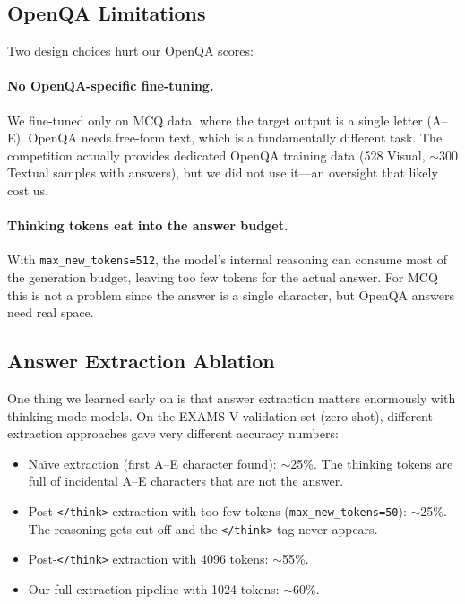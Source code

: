 \documentclass[]{ceurart}
\begin{document}
\subsection{OpenQA Limitations}
\label{sec:openqa_limits}

Two design choices hurt our OpenQA scores:

\paragraph{No OpenQA-specific fine-tuning.}
We fine-tuned only on MCQ data, where the target output is a single letter (A--E).
OpenQA needs free-form text, which is a fundamentally different task.
The competition actually provides dedicated OpenQA training data (528 Visual, $\sim$300 Textual samples with answers), but we did not use it---an oversight that likely cost us.

\paragraph{Thinking tokens eat into the answer budget.}
With \texttt{max\_new\_tokens=512}, the model's internal reasoning can consume most of the generation budget, leaving too few tokens for the actual answer.
For MCQ this is not a problem since the answer is a single character, but OpenQA answers need real space.

\subsection{Answer Extraction Ablation}
\label{sec:extraction_ablation}

One thing we learned early on is that answer extraction matters enormously with thinking-mode models.
On the EXAMS-V validation set (zero-shot), different extraction approaches gave very different accuracy numbers:

\begin{itemize}
    \item Na\"ive extraction (first A--E character found): $\sim$25\%. The thinking tokens are full of incidental A--E characters that are not the answer.
    \item Post-\texttt{</think>} extraction with too few tokens (\texttt{max\_new\_tokens=50}): $\sim$25\%. The reasoning gets cut off and the \texttt{</think>} tag never appears.
    \item Post-\texttt{</think>} extraction with 4096 tokens: $\sim$55\%.
    \item Our full extraction pipeline with 1024 tokens: $\sim$60\%.
\end{itemize}
\end{document}
